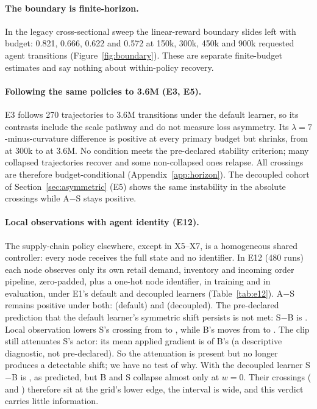 \paragraph{The boundary is finite-horizon.}
In the legacy cross-sectional sweep the linear-reward boundary slides left with budget: 0.821, 0.666,
0.622 and 0.572 at 150k, 300k, 450k and 900k requested agent transitions
(Figure~\ref{fig:boundary}). These are separate finite-budget estimates and say nothing about
within-policy recovery.

\paragraph{Following the same policies to 3.6M (E3, E5).}
E3 follows 270 trajectories to 3.6M transitions under the default learner, so its contrasts include the scale
pathway and do not measure loss asymmetry. Its $\lambda=7$-minus-curvature difference is positive at every primary
budget but shrinks, from \VfourHorizonStart{} at 300k to \VfourHorizonEnd{} at 3.6M. No condition meets the
pre-declared stability criterion; many collapsed trajectories recover and some non-collapsed ones relapse. All
crossings are therefore budget-conditional (Appendix~\ref{app:horizon}). The decoupled cohort of Section~\ref{sec:asymmetric}
(E5) shows the same instability in the absolute crossings while A$-$S stays positive.


\paragraph{Local observations with agent identity (E12).}
The supply-chain policy elsewhere, except in X5--X7, is a homogeneous shared controller: every node receives the full
state and no identifier. In E12 (480 runs) each node observes only its own retail demand, inventory and incoming order
pipeline, zero-padded, plus a one-hot node identifier, in training and in evaluation, under E1's default and
decoupled learners (Table~\ref{tab:e12}). A$-$S remains positive under both: \VtwelveAsymDefault{} (default) and
\VtwelveAsymDec{} (decoupled). The pre-declared prediction that the default learner's symmetric shift persists is
not met: S$-$B is \VtwelveSymDefault{}. Local observation lowers S's crossing from \VtwelveDefaultSFull{} to
\VtwelveDefaultS{}, while B's moves from \VtwelveDefaultBFull{} to \VtwelveDefaultB{}. The clip still attenuates S's
actor: its mean applied gradient is \VtwelveAppliedRatio{} of B's (a descriptive diagnostic, not pre-declared). So
the attenuation is present but no longer produces a detectable shift; we have no test of why. With the decoupled
learner S$-$B is \VtwelveSymDec{}, as predicted, but B and S collapse almost only at $w=0$. Their crossings
(\VtwelveDecB{} and \VtwelveDecS{}) therefore sit at the grid's lower edge, the interval is wide, and this verdict
carries little information.

